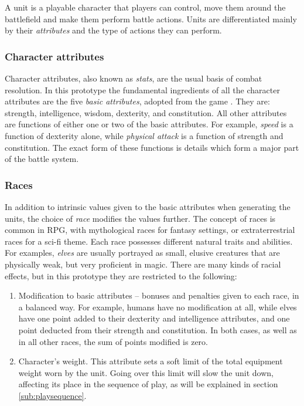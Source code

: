 A unit is a playable character that players can control, move them around the battlefield and make them perform battle actions. Units are differentiated mainly by their \textit{attributes} and the type of actions they can perform.

\subsubsection*{Character attributes}

Character attributes, also known as \textit{stats}, are the usual basis of combat resolution.\cite[94]{moore2011basics} In this prototype the fundamental ingredients of all the character attributes are the five \textit{basic attributes}, adopted from the game . They are: strength, intelligence, wisdom, dexterity, and constitution.\cite{sw-angband} All other attributes are functions of either one or two of the basic attributes. For example, \textit{speed} is a function of dexterity alone, while \textit{physical attack} is a function of strength and constitution. The exact form of these functions is details which form a major part of the battle system.

\subsubsection*{Races}

In addition to intrinsic values given to the basic attributes when generating the units, the choice of \textit{race} modifies the values further. The concept of races is common in RPG, with mythological races for fantasy settings, or extraterrestrial races for a sci-fi theme. Each race possesses different natural traits and abilities. For examples, \textit{elves} are usually portrayed as small, elusive creatures that are physically weak, but very proficient in magic. There are many kinds of racial effects, but in this prototype they are restricted to the following:
\begin{enumerate}
	\item Modification to basic attributes -- bonuses and penalties given to each race, in a balanced way. For example, humans have no modification at all, while elves have one point added to their dexterity and intelligence attributes, and one point deducted from their strength and constitution. In both cases, as well as in all other races, the sum of points modified is zero.
	\item Character's weight. This attribute sets a soft limit of the total equipment weight worn by the unit. Going over this limit will slow the unit down, affecting its place in the sequence of play, as will be explained in section \ref{sub:playsequence}.
\end{enumerate}

